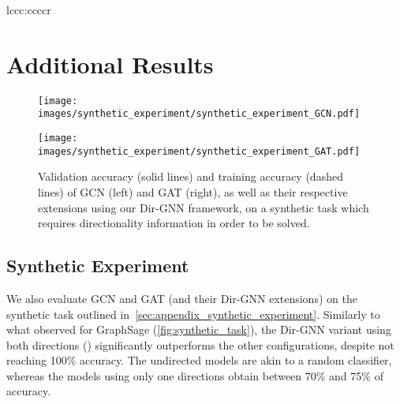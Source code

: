 \documentclass{article}
\newcommand\oursacro{Dir-GNN}
\theoremstyle{plain}
\theoremstyle{definition}
\theoremstyle{remark}
\begin{document}
\begin{table*}[t]
\begin{center}
\begin{small}
\begin{sc}
{\begin{tabular}{lccc:ccccr}
\bottomrule
\end{tabular}}
\end{sc}
\end{small}
\end{center}
\caption{Ablation study comparing base MPNNs on the undirected graph versus their \oursacro{} extensions on the directed graph. We conducted experiments with  (only in-edges),  (only out-edges), and  (both in- and out-edges, but with different weight matrices). For homophilic datasets (to the left of the dashed line), incorporating directionality does not significantly enhance or may slightly impair performance. However, for heterophilic datasets (to the right of the dashed line), the inclusion of directionality substantially improves accuracy.}
\label{tab:full_direction_ablation}
\end{table*}
 \section{Additional Results}

\begin{figure}[t!]
\centering
\label{fig:synthetic_gcn_gat}
\begin{minipage}[t]{0.5\linewidth}
  \centering
  \texttt{[image: images/synthetic\_experiment/synthetic\_experiment\_GCN.pdf]}
\end{minipage}\begin{minipage}[t]{.5\linewidth}
  \centering
  \texttt{[image: images/synthetic\_experiment/synthetic\_experiment\_GAT.pdf]}
\end{minipage}
\caption{Validation accuracy (solid lines) and training accuracy (dashed lines) of GCN (left) and GAT (right), as well as their respective extensions using our \oursacro{} framework, on a synthetic task which requires directionality information in order to be solved.}
  \label{fig:synthetic-gcn-gat}
\end{figure}

\subsection{Synthetic Experiment}
We also evaluate GCN and GAT (and their \oursacro{} extensions) on the synthetic task outlined in~\cref{sec:appendix_synthetic_experiment}. Similarly to what observed for GraphSage (\cref{fig:synthetic_task}), the \oursacro{} variant using both directions () significantly outperforms the other configurations, despite not reaching 100\% accuracy. The undirected models are akin to a random classifier, whereas the models using only one directions obtain between 70\% and 75\% of accuracy.
\end{document}
